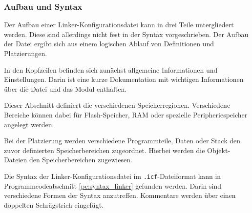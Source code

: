 
\subsubsection{Aufbau und Syntax}\label{kap:aufbau_linker_konfig}
Der Aufbau einer Linker-Konfigurationsdatei kann in drei Teile untergliedert werden.
Diese sind allerdings nicht fest in der Syntax vorgeschrieben.
Der Aufbau der Datei ergibt sich aus einem logischen Ablauf von Definitionen und Platzierungen.

\begin{description}[style=nextline]
	\item[Kopfzeile] In den Kopfzeilen befinden sich zunächst allgemeine Informationen und Einstellungen.
	Darin ist eine kurze Dokumentation mit wichtigen Informationen über die Datei und das Modul enthalten.
	
	\item[Speicherregionen] Dieser Abschnitt definiert die verschiedenen Speicherregionen. 
	Verschiedene Bereiche können dabei für Flash-Speicher, RAM oder spezielle Peripheriespeicher angelegt werden.
	
	\item[Platzierungen] Bei der Platzierung werden verschiedene Programmteile, Daten oder Stack den zuvor definierten Speicherbereichen zugeordnet. Hierbei werden die Objekt-Dateien den Speicherbereichen zugewiesen.
\end{description}

Die Syntax der Linker-Konfigurationsdatei im \verb*|.icf|-Dateiformat kann in Programmcodeabschnitt \ref{pc:syntax_linker} gefunden werden.
Darin sind verschiedene Formen der Syntax anzutreffen.
Kommentare werden über einen doppelten Schrägstrich eingefügt. \\

